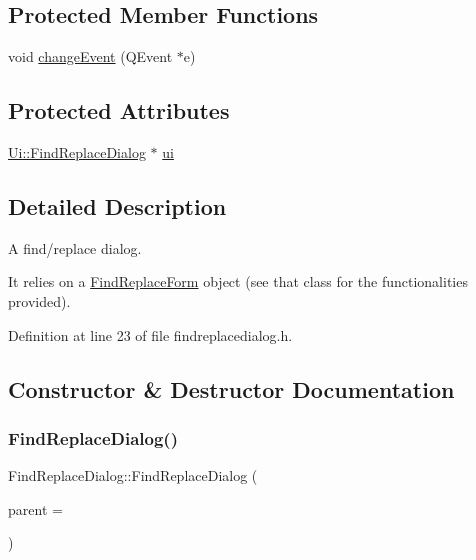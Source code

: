 \subsection*{Protected Member Functions}
\begin{DoxyCompactItemize}
\item 
void \hyperlink{class_ui_1_1_find_replace_dialog_a793bc999abeaedd4262d39161f521f35}{change\+Event} (Q\+Event $\ast$e)
\end{DoxyCompactItemize}
\subsection*{Protected Attributes}
\begin{DoxyCompactItemize}
\item 
\hyperlink{class_ui_1_1_find_replace_dialog}{Ui\+::\+Find\+Replace\+Dialog} $\ast$ \hyperlink{class_ui_1_1_find_replace_dialog_a29b7e2e415bc683d3dd089b366cccf4a}{ui}
\end{DoxyCompactItemize}


\subsection{Detailed Description}
A find/replace dialog.

It relies on a \hyperlink{class_find_replace_form}{Find\+Replace\+Form} object (see that class for the functionalities provided). 

Definition at line 23 of file findreplacedialog.\+h.



\subsection{Constructor \& Destructor Documentation}
\mbox{\label{class_ui_1_1_find_replace_dialog_a2631641ec6995a87bc4da0a99fb6f9bd}} 
\subsubsection{\texorpdfstring{Find\+Replace\+Dialog()}{FindReplaceDialog()}}
{\footnotesize\ttfamily Find\+Replace\+Dialog\+::\+Find\+Replace\+Dialog (\begin{DoxyParamCaption}\item[{Q\+Widget $\ast$}]{parent = {} }\end{DoxyParamCaption})}



